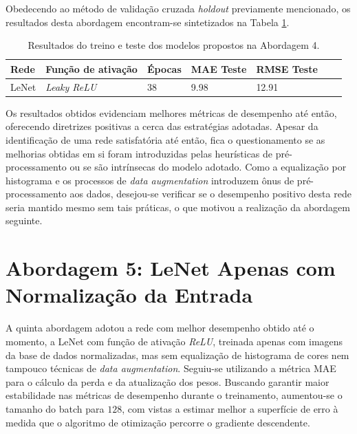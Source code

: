 	Obedecendo ao método de validação cruzada \emph{holdout} previamente mencionado, os resultados desta abordagem encontram-se sintetizados na Tabela \ref{tab:results-4}.

	\begin{table}[!ht]
		\centering
		\caption{Resultados do treino e teste dos modelos propostos na Abordagem 4.}
		\label{tab:results-4}
			\begin{tabular}{l l l l l l l}
				\toprule
				Rede & Função de ativação & Épocas & MAE Teste & RMSE Teste \\
				\midrule
				LeNet & \emph{Leaky ReLU} & 38 & 9.98 & 12.91 \\
				\bottomrule
			\end{tabular}
	\end{table}

	Os resultados obtidos evidenciam melhores métricas de desempenho até então, oferecendo diretrizes positivas a cerca das estratégias adotadas. Apesar da identificação de uma rede satisfatória até então, fica o questionamento se as melhorias obtidas em si foram introduzidas pelas heurísticas de pré-processamento ou se são intrínsecas do modelo adotado. Como a equalização por histograma e os processos de \emph{data augmentation} introduzem ônus de pré-processamento aos dados, desejou-se verificar se o desempenho positivo desta rede seria mantido mesmo sem tais práticas, o que motivou a realização da abordagem seguinte.

\section{Abordagem 5: LeNet Apenas com Normalização da Entrada}%
	A quinta abordagem adotou a rede com melhor desempenho obtido até o momento, a LeNet com função de ativação \emph{ReLU}, treinada apenas com imagens da base de dados normalizadas, mas sem equalização de histograma de cores nem tampouco técnicas de \emph{data augmentation}. Seguiu-se utilizando a métrica MAE para o cálculo da perda e da atualização dos pesos. Buscando garantir maior estabilidade nas métricas de desempenho durante o treinamento, aumentou-se o tamanho do batch para $128$, com vistas a estimar melhor a superfície de erro à medida que o algoritmo de otimização percorre o gradiente descendente.

